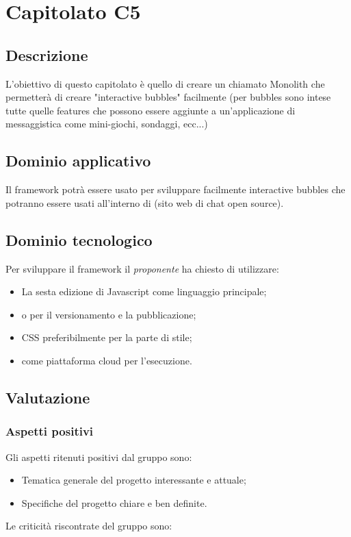 \documentclass[../StudioDiFattibilita.tex]{subfiles}
\begin{document}
	\section{Capitolato C5}
		\subsection{Descrizione}
		L'obiettivo di questo capitolato è quello di creare un  chiamato Monolith che permetterà di creare "interactive bubbles" facilmente (per bubbles sono intese tutte quelle features che possono essere aggiunte a un'applicazione di messaggistica come mini-giochi, sondaggi, ecc...)   
		\subsection{Dominio applicativo}
		Il framework potrà essere usato per sviluppare facilmente interactive bubbles che potranno essere usati all'interno di  (sito web di chat open source).
		\subsection{Dominio tecnologico}
		Per sviluppare il framework il \textit{proponente} ha chiesto di utilizzare:
			\begin{itemize}
			\item La sesta edizione di Javascript come linguaggio principale; 
			\item {} o  per il versionamento e la pubblicazione;
			\item CSS preferibilmente per la parte di stile;
			\item {} come piattaforma cloud per l'esecuzione.
			\end{itemize}
		\subsection{Valutazione}
			\subsubsection{Aspetti positivi}
			Gli aspetti ritenuti positivi dal gruppo sono:
				\begin{itemize}
				\item Tematica generale del progetto interessante e attuale;
				\item Specifiche del progetto chiare e ben definite.
				\end{itemize}
			Le criticità riscontrate del gruppo sono:	
\end{document}
